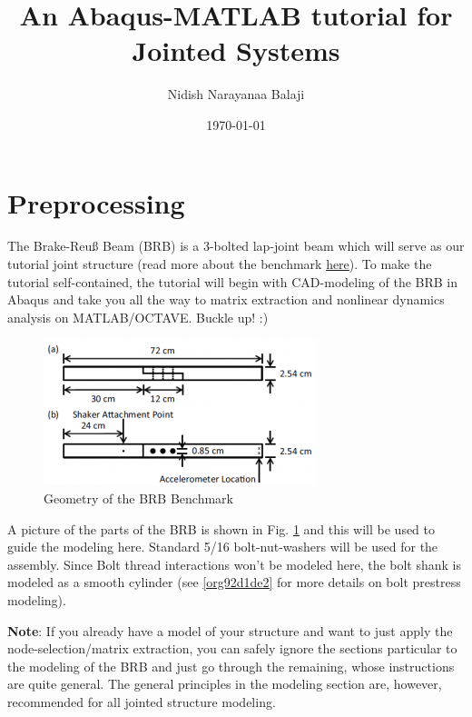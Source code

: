 \documentclass[11pt]{article}
\author{Nidish Narayanaa Balaji}
\date{\today}
\title{An Abaqus-MATLAB tutorial for Jointed Systems}
\begin{document}
\maketitle
\tableofcontents


\section{Preprocessing}
\label{sec:org7392b52}

The Brake-Reuß Beam (BRB) is a 3-bolted lap-joint beam which will serve as our tutorial joint structure (read more about the benchmark \href{https://jointmechanics.org/index.php/Benchmarks\#The\_Brake-Reu\%C3\%9F\_Beams}{here}).
To make the tutorial self-contained, the tutorial will begin with CAD-modeling of the BRB in Abaqus and take you all the way to matrix extraction and nonlinear dynamics analysis on MATLAB/OCTAVE.
Buckle up! :)

\begin{figure}[htbp]
\centering
\includegraphics[width=.9\linewidth]{./figs/300px-BRB.png}
\caption{\label{fig:org0ef8404}Geometry of the BRB Benchmark}
\end{figure}

A picture of the parts of the BRB is shown in Fig. \ref{fig:org0ef8404} and this will be used to guide the modeling here.
Standard 5/16 bolt-nut-washers will be used for the assembly. Since Bolt thread interactions won't be modeled here, the bolt shank is modeled as a smooth cylinder (see \ref{org92d1de2} for more details on bolt prestress modeling).

\textbf{Note}: If you already have a model of your structure and want to just apply the node-selection/matrix extraction, you can safely ignore the sections particular to the modeling of the BRB and just go through the remaining, whose instructions are quite general.
The general principles in the modeling section are, however, recommended for all jointed structure modeling.
\end{document}
